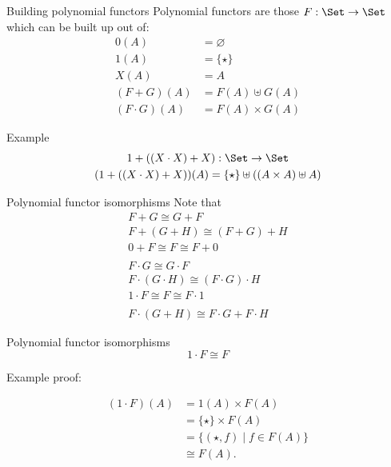 \documentclass[xcolor=svgnames,12pt]{beamer}
\newenvironment{xframe}[1][]
  {\begin{frame}[fragile,environment=xframe,#1]}
  {\end{frame}}
\begin{document}
\begin{xframe}{Building polynomial functors}
  Polynomial functors are those $F : \Set \to \Set$ which can be built
  up out of:
  \begin{align*}
    0(A) &= \varnothing \\
    1(A) &= \{\star\} \\
    X(A) &= A \\
    (F + G)(A) &= F(A) \uplus G(A) \\
    (F \cdot G)(A) &= F(A) \times G(A)
  \end{align*}
\end{xframe}

\begin{xframe}{Example}
  \begin{gather*}
    1 + ((X \cdot X) + X) : \Set \to \Set \\
    (1 + ((X \cdot X) + X))(A) = \{\star\} \uplus ((A \times A) \uplus A)
  \end{gather*}
\end{xframe}

\begin{xframe}{Polynomial functor isomorphisms}
  Note that
  \begin{gather*}
    F + G \cong G + F \\
    F + (G + H) \cong (F + G) + H \\
    0 + F \cong F \cong F + 0 \\ \\
    F \cdot G \cong G \cdot F \\
    F \cdot (G \cdot H) \cong (F \cdot G) \cdot H \\
    1 \cdot F \cong F \cong F \cdot 1 \\ \\
    F \cdot (G + H) \cong F \cdot G + F \cdot H
  \end{gather*}
\end{xframe}

\begin{xframe}{Polynomial functor isomorphisms}
\[ 1 \cdot F \cong F \]

Example proof:

  \begin{align*}
    (1 \cdot F)(A) &= 1(A) \times F(A) \\
    &= \{\star\} \times F(A) \\
    &= \{(\star, f) \mid f \in F(A)\} \\
    &\cong F(A).
  \end{align*}
\end{xframe}
\end{document}
